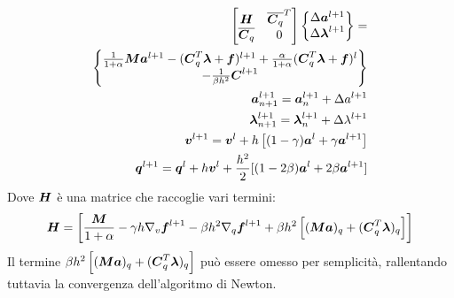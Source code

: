 \begin{align} \nonumber
    \begin{bmatrix}
    {\boldsymbol{H}} & \overline{{\boldsymbol{C}}_q}^T \\ \overline{{\boldsymbol{C}}_q} & 0 
    \end{bmatrix}
    \begin{Bmatrix}
    \Delta {\boldsymbol{a}}^{l+1} \\ \Delta {\boldsymbol{\lambda}}^{l+1}
    \end{Bmatrix}  = \\
    \begin{Bmatrix}
        \frac{1}{1+\alpha} {\boldsymbol{M}} {\boldsymbol{a}}^{l+1} - ({\boldsymbol{C}}_q^T {\boldsymbol{\lambda}}+{\boldsymbol{f}})^{l+1} 
        +\frac{\alpha}{1+\alpha}({\boldsymbol{C}}_q^T {\boldsymbol{\lambda}}+{\boldsymbol{f}})^l \\
        -\frac{1}{\beta h^2}{\boldsymbol{C}}^{l+1}
    \end{Bmatrix} \\
    {\boldsymbol{a}}_{n+1}^{l+1} = {\boldsymbol{a}}_n^{l+1} + \Delta a^{l+1} \\
    {\boldsymbol{\lambda}}_{n+1}^{l+1} = {\boldsymbol{\lambda}}_n^{l+1} + \Delta \lambda^{l+1} \\
    {\boldsymbol{v}}^{l+1} = {\boldsymbol{v}}^l +h \left[ (1-\gamma){\boldsymbol{a}}^l + \gamma {\boldsymbol{a}}^{l+1} \right] \\
    {\boldsymbol{q}}^{l+1} = {\boldsymbol{q}}^l +h{\boldsymbol{v}}^l+\frac{h^2}{2}[(1-2\beta){\boldsymbol{a}}^l+2\beta{\boldsymbol{a}}^{l+1}]
\end{align}
Dove ${\boldsymbol{H}}$  è una matrice che raccoglie vari termini:
\begin{equation}
    {\boldsymbol{H}} = \left[ \frac{ {\boldsymbol{M}}}{1+\alpha}-\gamma h \nabla_v{\boldsymbol{f}}^{l+1} -\beta h^2 \nabla_q{\boldsymbol{f}}^{l+1} +
    \beta h^2 \left[ ({\boldsymbol{M}} {\boldsymbol{a}})_q + ({\boldsymbol{C}}_q^T {\boldsymbol{\lambda}})_q \right] \right]
\end{equation}
Il termine \( \beta h^2 \left[ ({\boldsymbol{M}} {\boldsymbol{a}})_q + ({\boldsymbol{C}}_q^T {\boldsymbol{\lambda}})_q \right] \) può essere omesso per semplicità, rallentando tuttavia la convergenza dell'algoritmo di Newton. 
